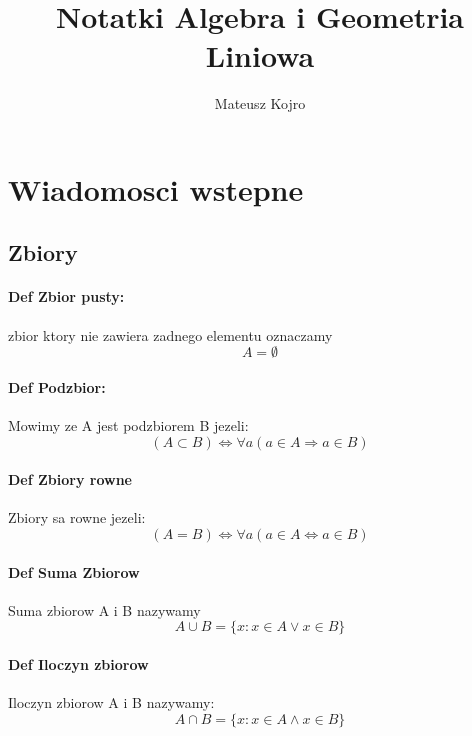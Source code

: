 \documentclass[a4paper]{article}
\title{Notatki Algebra i Geometria Liniowa}
\author{Mateusz Kojro}
\begin{document}
\maketitle
%
%
    \section{Wiadomosci wstepne}
    \subsection{Zbiory}
    \paragraph{Def Zbior pusty:}
    zbior ktory nie zawiera zadnego elementu oznaczamy \begin{equation}
        A = \emptyset
    \end{equation}
    \paragraph{Def Podzbior:}
    Mowimy ze A jest podzbiorem B jezeli:
    \begin{equation}
        (A \subset B) \Leftrightarrow \forall a(a \in A \Rightarrow a \in B)
    \end{equation}
    \paragraph{Def Zbiory rowne}
    Zbiory sa rowne jezeli:
    \begin{equation}
        (A = B) \Leftrightarrow \forall a (a \in A \Leftrightarrow a \in B)
    \end{equation}
    \paragraph{Def Suma Zbiorow}
    Suma zbiorow A i B nazywamy
    \begin{equation}
        A \cup B = \{ x : x \in A \vee x \in B\}
    \end{equation}
    \paragraph{Def Iloczyn zbiorow}
    Iloczyn zbiorow A i B nazywamy:
    \begin{equation}
        A \cap B = \{ x:x \in A \wedge x \in B \}
    \end{equation}
\end{document}
